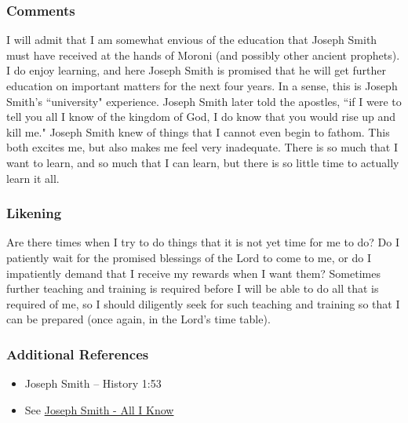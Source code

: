 \documentclass[12pt]{report}
\begin{document}
\subsubsection{Comments\label{js:comments20}}
I will admit that I am somewhat envious of the education that Joseph Smith must have received at the hands of Moroni (and possibly other ancient prophets). I do enjoy learning, and here Joseph Smith is promised that he will get further education on important matters for the next four years.  In a sense, this is Joseph Smith's ``university" experience.  Joseph Smith later told the apostles, ``if I were to tell you all I know of the kingdom of God, I do know that you would rise up and kill me."  Joseph Smith knew of things that I cannot even begin to fathom.  This both excites me, but also makes me feel very inadequate.  There is so much that I want to learn, and so much that I can learn, but there is so little time to actually learn it all.

\subsubsection{Likening\label{js:likening20}}
Are there times when I try to do things that it is not yet time for me to do?  Do I patiently wait for the promised blessings of the Lord to come to me, or do I impatiently demand that I receive my rewards when I want them?  Sometimes further teaching and training is required before I will be able to do all that is required of me, so I should diligently seek for such teaching and training so that I can be prepared (once again, in the Lord's time table).

\subsubsection{Additional References\label{js:references20}}
\begin{itemize}
\item Joseph Smith -- History 1:53
\item See \href{http://emp.byui.edu/satterfieldb/quotes/If%20I%20were%20to%20tell%20you%20all%20I%20know%20%20JosephSmith.html}{Joseph Smith - All I Know}
\end{itemize}

\end{document}
